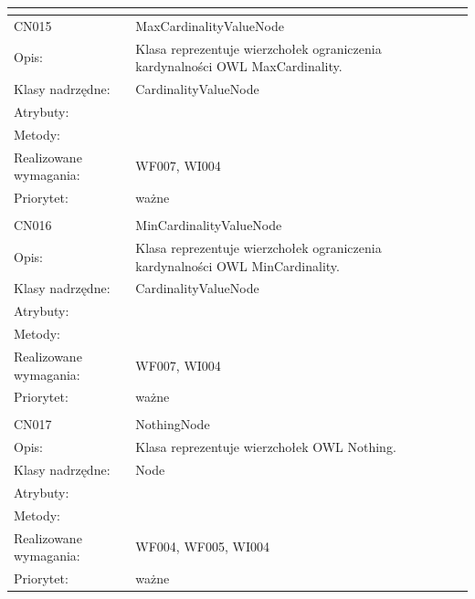 \documentclass[a4paper,10pt]{article}
\begin{document}
\begin{center}
\begin{longtable}{|m{3cm}|m{9cm}|}
\multicolumn{2}{c}{} \\
 \hline

CN015 & MaxCardinalityValueNode \\ \hline
Opis: & Klasa reprezentuje wierzchołek ograniczenia kardynalności OWL MaxCardinality.    \\ \hline
Klasy nadrzędne: & CardinalityValueNode     \\ \hline
Atrybuty: & %
 \\ \hline
Metody: & %
  \\ \hline
Realizowane wymagania: & WF007, WI004 \\ \hline
Priorytet: & ważne  \\ \hline

\multicolumn{2}{c}{} \\
 \hline

CN016 & MinCardinalityValueNode \\ \hline
Opis: & Klasa reprezentuje wierzchołek ograniczenia kardynalności OWL MinCardinality.    \\ \hline
Klasy nadrzędne: & CardinalityValueNode     \\ \hline
Atrybuty: & %
 \\ \hline
Metody: & %
  \\ \hline
Realizowane wymagania: & WF007, WI004 \\ \hline
Priorytet: & ważne  \\ \hline

\multicolumn{2}{c}{} \\
 \hline

CN017 & NothingNode \\ \hline
Opis: & Klasa reprezentuje wierzchołek OWL Nothing.    \\ \hline
Klasy nadrzędne: & Node     \\ \hline
Atrybuty: & %
 \\ \hline
Metody: & %
  \\ \hline
Realizowane wymagania: & WF004, WF005, WI004 \\ \hline
Priorytet: & ważne  \\ \hline


\end{longtable}
\end{center}
\end{document}

